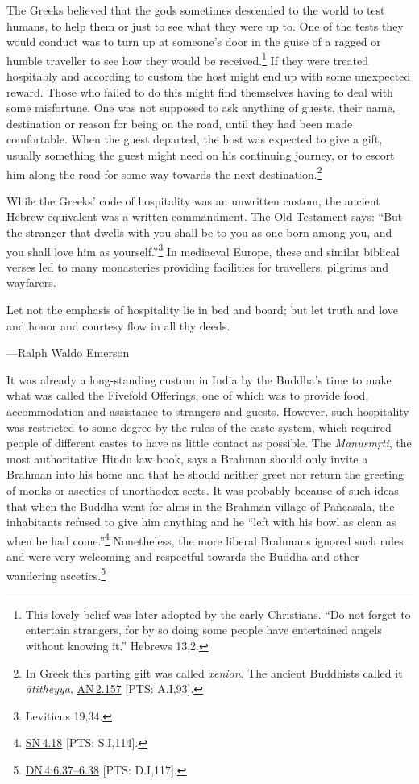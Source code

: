 \documentclass[10pt, openright]{book}
\newenvironment{epigram-2}%
{%
\setstretch{1.4}
\vspace{1em}
\noindent
\quoting[leftmargin=2cm,rightmargin=2cm]%
\begin{itshape}
\large
}%
{\end{itshape}\endquoting
}%
\newenvironment{epigram-2-cite}%
{%
\quoting[leftmargin=2cm,rightmargin=2cm]%
\noindent\normal\hspace*{\fill} 
}%
{\endquoting
}%
\begin{document}
The Greeks believed that the gods sometimes descended to the world to test humans, to help them or just to see what they were up to. One of the tests they would conduct was to turn up at someone’s door in the guise of a ragged or humble traveller to see how they would be received.\footnote {This lovely belief was later adopted by the early Christians. “Do not forget to entertain strangers, for by so doing some people have entertained angels without knowing it.” Hebrews 13,2.} If they were treated hospitably and according to custom the host might end up with some unexpected reward. Those who failed to do this might find themselves having to deal with some misfortune. One was not supposed to ask anything of guests, their name, destination or reason for being on the road, until they had been made comfortable. When the guest departed, the host was expected to give a gift, usually something the guest might need on his continuing journey, or to escort him along the road for some way towards the next destination.\footnote {In Greek this parting gift was called \textit{xenion}. The ancient Buddhists called it \textit{ātitheyya}, \href{https://suttacentral.net/an2.157/en/sujato}{AN 2.157} [PTS: A.I,93].}


While the Greeks’ code of hospitality was an unwritten custom, the ancient Hebrew equivalent was a written commandment. The Old Testament says: “But the stranger that dwells with you shall be to you as one born among you, and you shall love him as yourself.”\footnote {Leviticus 19,34.} In mediaeval Europe, these and similar biblical verses led to many monasteries providing facilities for travellers, pilgrims and wayfarers.


\begin{epigram-2}
Let not the emphasis of hospitality lie in bed and board; but let truth and love and honor and courtesy flow in all thy deeds.
\end{epigram-2}
\begin{epigram-2-cite}
—Ralph Waldo Emerson
\end{epigram-2-cite}

It was already a long-standing custom in India by the Buddha’s time to make what was called the Fivefold Offerings, one of which was to provide food, accommodation and assistance to strangers and guests. However, such hospitality was restricted to some degree by the rules of the caste system, which required people of different castes to have as little contact as possible. The \textit{Manusmṛti}, the most authoritative Hindu law book, says a Brahman should only invite a Brahman into his home and that he should neither greet nor return the greeting of monks or ascetics of unorthodox sects. It was probably because of such ideas that when the Buddha went for alms in the Brahman village of Pañcasālā, the inhabitants refused to give him anything and he “left with his bowl as clean as when he had come.”\footnote {\href{https://suttacentral.net/sn4.18/en/sujato}{SN 4.18} [PTS: S.I,114].} Nonetheless, the more liberal Brahmans ignored such rules and were very welcoming and respectful towards the Buddha and other wandering ascetics.\footnote {\href{https://suttacentral.net/dn4/en/sujato\#6.37}{DN 4:6.37–6.38} [PTS: D.I,117].}
\end{document}
